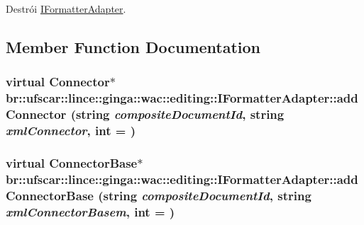 Destrói \hyperlink{classbr_1_1ufscar_1_1lince_1_1ginga_1_1wac_1_1editing_1_1IFormatterAdapter}{IFormatterAdapter}. 



\subsection{Member Function Documentation}
\hypertarget{classbr_1_1ufscar_1_1lince_1_1ginga_1_1wac_1_1editing_1_1IFormatterAdapter_a540918ec7898b4400e8a6884f250516e}{
\subsubsection[{addConnector}]{\setlength{\rightskip}{0pt plus 5cm}virtual Connector$\ast$ br::ufscar::lince::ginga::wac::editing::IFormatterAdapter::addConnector (string {\em compositeDocumentId}, \/  string {\em xmlConnector}, \/  int = {})}}
\label{classbr_1_1ufscar_1_1lince_1_1ginga_1_1wac_1_1editing_1_1IFormatterAdapter_a540918ec7898b4400e8a6884f250516e}
\hypertarget{classbr_1_1ufscar_1_1lince_1_1ginga_1_1wac_1_1editing_1_1IFormatterAdapter_a5c963a0a746a97eb226c4648331c1a7f}{
\subsubsection[{addConnectorBase}]{\setlength{\rightskip}{0pt plus 5cm}virtual ConnectorBase$\ast$ br::ufscar::lince::ginga::wac::editing::IFormatterAdapter::addConnectorBase (string {\em compositeDocumentId}, \/  string {\em xmlConnectorBasem}, \/  int = {})}}
\label{classbr_1_1ufscar_1_1lince_1_1ginga_1_1wac_1_1editing_1_1IFormatterAdapter_a5c963a0a746a97eb226c4648331c1a7f}
